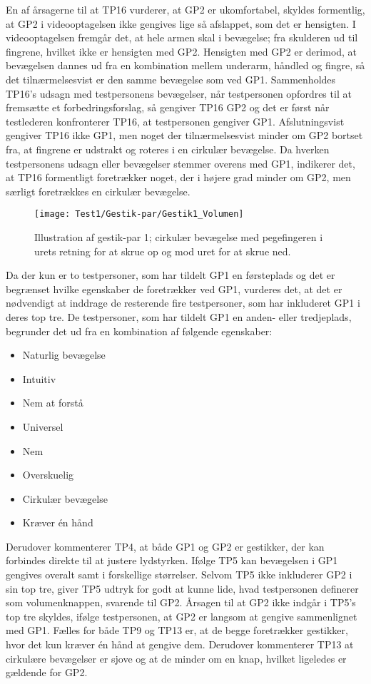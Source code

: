 En af årsagerne til at TP16 vurderer, at GP2 er ukomfortabel, skyldes formentlig, at GP2 i videooptagelsen ikke gengives lige så afslappet, som det er hensigten. I videooptagelsen fremgår det, at hele armen skal i bevægelse; fra skulderen ud til fingrene, hvilket ikke er hensigten med GP2. Hensigten med GP2 er derimod, at bevægelsen dannes ud fra en kombination mellem underarm, håndled og fingre, så det tilnærmelsesvist er den samme bevægelse som ved GP1. Sammenholdes TP16's udsagn med testpersonens bevægelser, når testpersonen opfordres til at fremsætte et forbedringsforslag, så gengiver TP16 GP2 og det er først når testlederen konfronterer TP16, at testpersonen gengiver GP1. Afslutningsvist gengiver TP16 ikke GP1, men noget der tilnærmelsesvist minder om GP2 bortset fra, at fingrene er udstrakt og roteres i en cirkulær bevægelse. Da hverken testpersonens udsagn eller bevægelser stemmer overens med GP1, indikerer det, at TP16 formentligt foretrækker noget, der i højere grad minder om GP2, men særligt foretrækkes en cirkulær bevægelse.
%
\begin{figure}[H]
	\centering
	\texttt{[image: Test1/Gestik-par/Gestik1\_Volumen]}
	\caption{Illustration af gestik-par 1; cirkulær bevægelse med pegefingeren i urets retning for at skrue op og mod uret for at skrue ned.}
	\label{fig:GestikPar1Volumen}
\end{figure}
\noindent
%
Da der kun er to testpersoner, som har tildelt GP1 en førsteplads og det er begrænset hvilke egenskaber de foretrækker ved GP1, vurderes det, at det er nødvendigt at inddrage de resterende fire testpersoner, som har inkluderet GP1 i deres top tre. De testpersoner, som har tildelt GP1 en anden- eller tredjeplads, begrunder det ud fra en kombination af følgende egenskaber: 
%
\begin{multicols}{3}
    \begin{itemize}
        \item Naturlig bevægelse
        \item Intuitiv 
        \item Nem at forstå
        \item Universel
        \item Nem
        \item Overskuelig
        \item Cirkulær bevægelse
        \item Kræver én hånd
\end{itemize}
\end{multicols}
\noindent
%
Derudover kommenterer TP4, at både GP1 og GP2 er gestikker, der kan forbindes direkte til at justere lydstyrken. Ifølge TP5 kan bevægelsen i GP1 gengives overalt samt i forskellige størrelser. Selvom TP5 ikke inkluderer GP2 i sin top tre, giver TP5 udtryk for godt at kunne lide, hvad testpersonen definerer som volumenknappen, svarende til GP2. Årsagen til at GP2 ikke indgår i TP5's top tre skyldes, ifølge testpersonen, at GP2 er langsom at gengive sammenlignet med GP1. Fælles for både TP9 og TP13 er, at de begge foretrækker gestikker, hvor det kun kræver én hånd at gengive dem. Derudover kommenterer TP13 at cirkulære bevægelser er sjove og at de minder om en knap, hvilket ligeledes er gældende for GP2.      
%
